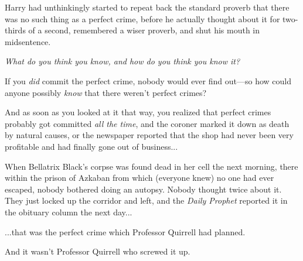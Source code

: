 Harry had unthinkingly started to repeat back the standard proverb that there was no such thing as a perfect crime, before he actually thought about it for two-thirds of a second, remembered a wiser proverb, and shut his mouth in midsentence.

\emph{What do you think you know, and how do you think you know it?}

If you \emph{did} commit the perfect crime, nobody would ever find out—so how could anyone possibly \emph{know} that there weren’t perfect crimes?

And as soon as you looked at it that way, you realized that perfect crimes probably got committed \emph{all the time}, and the coroner marked it down as death by natural causes, or the newspaper reported that the shop had never been very profitable and had finally gone out of business...

When Bellatrix Black’s corpse was found dead in her cell the next morning, there within the prison of Azkaban from which (everyone knew) no one had ever escaped, nobody bothered doing an autopsy. Nobody thought twice about it. They just locked up the corridor and left, and the \emph{Daily Prophet} reported it in the obituary column the next day...

...that was the perfect crime which Professor Quirrell had planned.

And it wasn’t Professor Quirrell who screwed it up.

